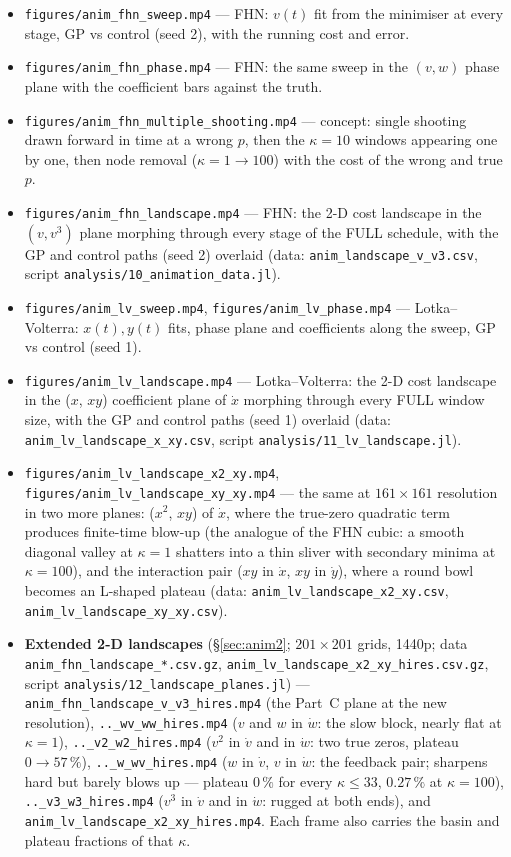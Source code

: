 \documentclass[10pt]{article}
\begin{document}
\begin{itemize}[leftmargin=1.4em, itemsep=0pt]
\item \texttt{figures/anim\_fhn\_sweep.mp4} --- FHN: $v(t)$ fit from the minimiser at every stage, GP vs control (seed 2), with the running cost and error.
\item \texttt{figures/anim\_fhn\_phase.mp4} --- FHN: the same sweep in the $(v,w)$ phase plane with the coefficient bars against the truth.
\item \texttt{figures/anim\_fhn\_multiple\_shooting.mp4} --- concept: single shooting drawn forward in time at a wrong $p$, then the $\kappa=10$ windows appearing one by one, then node removal ($\kappa=1\to100$) with the cost of the wrong and true $p$.
\item \texttt{figures/anim\_fhn\_landscape.mp4} --- FHN: the 2-D cost landscape in the $(v,v^3)$ plane morphing through every stage of the FULL schedule, with the GP and control paths (seed 2) overlaid (data: \texttt{anim\_landscape\_v\_v3.csv}, script \texttt{analysis/10\_animation\_data.jl}).
\item \texttt{figures/anim\_lv\_sweep.mp4}, \texttt{figures/anim\_lv\_phase.mp4} --- Lotka--Volterra: $x(t),y(t)$ fits, phase plane and coefficients along the sweep, GP vs control (seed 1).
\item \texttt{figures/anim\_lv\_landscape.mp4} --- Lotka--Volterra: the 2-D cost landscape in the ($x$, $xy$) coefficient plane of $\dot x$ morphing through every FULL window size, with the GP and control paths (seed 1) overlaid (data: \texttt{anim\_lv\_landscape\_x\_xy.csv}, script \texttt{analysis/11\_lv\_landscape.jl}).
\item \texttt{figures/anim\_lv\_landscape\_x2\_xy.mp4}, \texttt{figures/anim\_lv\_landscape\_xy\_xy.mp4} --- the same at $161\times161$ resolution in two more planes: ($x^2$, $xy$) of $\dot x$, where the true-zero quadratic term produces finite-time blow-up (the analogue of the FHN cubic: a smooth diagonal valley at $\kappa=1$ shatters into a thin sliver with secondary minima at $\kappa=100$), and the interaction pair ($xy$ in $\dot x$, $xy$ in $\dot y$), where a round bowl becomes an L-shaped plateau (data: \texttt{anim\_lv\_landscape\_x2\_xy.csv}, \texttt{anim\_lv\_landscape\_xy\_xy.csv}).
\item \textbf{Extended 2-D landscapes} (\S\ref{sec:anim2}; $201\times201$ grids, 1440p; data \texttt{anim\_fhn\_landscape\_*.csv.gz}, \texttt{anim\_lv\_landscape\_x2\_xy\_hires.csv.gz}, script \texttt{analysis/12\_landscape\_planes.jl}) --- \texttt{anim\_fhn\_landscape\_v\_v3\_hires.mp4} (the Part~C plane at the new resolution), \texttt{..\_wv\_ww\_hires.mp4} ($v$ and $w$ in $\dot w$: the slow block, nearly flat at $\kappa=1$), \texttt{..\_v2\_w2\_hires.mp4} ($v^2$ in $\dot v$ and in $\dot w$: two true zeros, plateau $0\to57\,\%$), \texttt{..\_w\_wv\_hires.mp4} ($w$ in $\dot v$, $v$ in $\dot w$: the feedback pair; sharpens hard but barely blows up --- plateau $0\,\%$ for every $\kappa\le33$, $0.27\,\%$ at $\kappa=100$), \texttt{..\_v3\_w3\_hires.mp4} ($v^3$ in $\dot v$ and in $\dot w$: rugged at both ends), and \texttt{anim\_lv\_landscape\_x2\_xy\_hires.mp4}. Each frame also carries the basin and plateau fractions of that $\kappa$.

\end{itemize}
\end{document}
